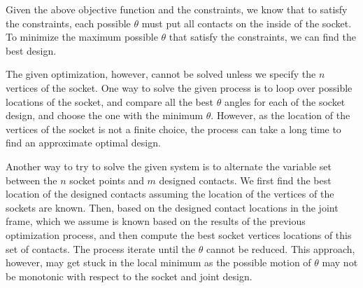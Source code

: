 Given the above objective function and the constraints, we know that to satisfy the constraints, each possible $\theta$ must put all contacts on the inside of the socket. To minimize the maximum possible $\theta$ that satisfy the constraints, we can find the best design. 

The given optimization, however, cannot be solved unless we specify the $n$ vertices of the socket. One way to solve the given process is to loop over possible locations of the socket, and compare all the best $\theta$ angles for each of the socket design, and choose the one with the minimum $\theta$. However, as the location of the vertices of the socket is not a finite choice, the process can take a long time to find an approximate optimal design. 

Another way to try to solve the given system is to alternate the variable set between the $n$ socket points and $m$ designed contacts. We first find the best location of the designed contacts assuming the location of the vertices of the sockets are known. Then, based on the designed contact locations in the joint frame, which we assume is known based on the results of the previous optimization process, and then compute the best socket vertices locations of this set of contacts. The process iterate until the $\theta$ cannot be reduced. This approach, however, may get stuck in the local minimum as the possible motion of $\theta$ may not be monotonic with respect to the socket and joint design. 

